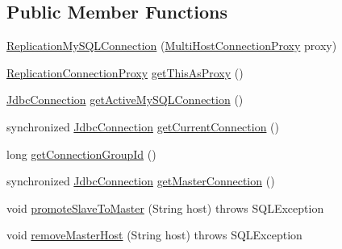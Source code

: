 \subsection*{Public Member Functions}
\begin{DoxyCompactItemize}
\item 
\mbox{\hyperlink{classcom_1_1mysql_1_1cj_1_1jdbc_1_1ha_1_1_replication_my_s_q_l_connection_a3913b09eb11f8d9c5b45bc9f540e3a9e}{Replication\+My\+S\+Q\+L\+Connection}} (\mbox{\hyperlink{classcom_1_1mysql_1_1cj_1_1jdbc_1_1ha_1_1_multi_host_connection_proxy}{Multi\+Host\+Connection\+Proxy}} proxy)
\item 
\mbox{\hyperlink{classcom_1_1mysql_1_1cj_1_1jdbc_1_1ha_1_1_replication_connection_proxy}{Replication\+Connection\+Proxy}} \mbox{\hyperlink{classcom_1_1mysql_1_1cj_1_1jdbc_1_1ha_1_1_replication_my_s_q_l_connection_afb9d97b6beebc9ee5afe106674c85113}{get\+This\+As\+Proxy}} ()
\item 
\mbox{\hyperlink{interfacecom_1_1mysql_1_1cj_1_1jdbc_1_1_jdbc_connection}{Jdbc\+Connection}} \mbox{\hyperlink{classcom_1_1mysql_1_1cj_1_1jdbc_1_1ha_1_1_replication_my_s_q_l_connection_af2fc965f281a5dfafc5af16aaa200ef3}{get\+Active\+My\+S\+Q\+L\+Connection}} ()
\item 
synchronized \mbox{\hyperlink{interfacecom_1_1mysql_1_1cj_1_1jdbc_1_1_jdbc_connection}{Jdbc\+Connection}} \mbox{\hyperlink{classcom_1_1mysql_1_1cj_1_1jdbc_1_1ha_1_1_replication_my_s_q_l_connection_a0d98dee5ddb333ca8f8cab2f41755205}{get\+Current\+Connection}} ()
\item 
long \mbox{\hyperlink{classcom_1_1mysql_1_1cj_1_1jdbc_1_1ha_1_1_replication_my_s_q_l_connection_a4d63ae17059125762c0103bbaed5e3c7}{get\+Connection\+Group\+Id}} ()
\item 
synchronized \mbox{\hyperlink{interfacecom_1_1mysql_1_1cj_1_1jdbc_1_1_jdbc_connection}{Jdbc\+Connection}} \mbox{\hyperlink{classcom_1_1mysql_1_1cj_1_1jdbc_1_1ha_1_1_replication_my_s_q_l_connection_ac5b7f61a6500ebb3006957d7f32f407d}{get\+Master\+Connection}} ()
\item 
void \mbox{\hyperlink{classcom_1_1mysql_1_1cj_1_1jdbc_1_1ha_1_1_replication_my_s_q_l_connection_a0f456ea68e82ca3e3306fd8607ea191e}{promote\+Slave\+To\+Master}} (String host)  throws S\+Q\+L\+Exception 
\item 
void \mbox{\hyperlink{classcom_1_1mysql_1_1cj_1_1jdbc_1_1ha_1_1_replication_my_s_q_l_connection_a0742e97205fb19aa79836326df2b5f47}{remove\+Master\+Host}} (String host)  throws S\+Q\+L\+Exception 
\item 

\end{DoxyCompactItemize}
